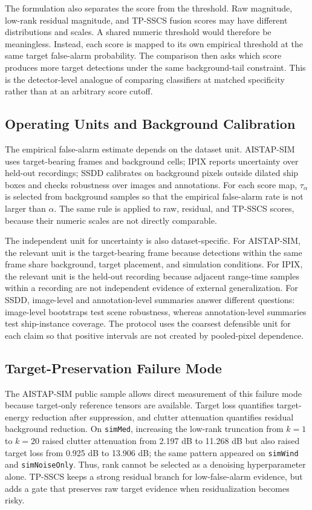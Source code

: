 \documentclass[journal]{IEEEtran}
\begin{document}
The formulation also separates the score from the threshold. Raw magnitude, low-rank residual magnitude, and TP-SSCS fusion scores may have different distributions and scales. A shared numeric threshold would therefore be meaningless. Instead, each score is mapped to its own empirical threshold at the same target false-alarm probability. The comparison then asks which score produces more target detections under the same background-tail constraint. This is the detector-level analogue of comparing classifiers at matched specificity rather than at an arbitrary score cutoff.

\subsection{Operating Units and Background Calibration}

The empirical false-alarm estimate depends on the dataset unit. AISTAP-SIM uses target-bearing frames and background cells; IPIX reports uncertainty over held-out recordings; SSDD calibrates on background pixels outside dilated ship boxes and checks robustness over images and annotations. For each score map, $\tau_\alpha$ is selected from background samples so that the empirical false-alarm rate is not larger than $\alpha$. The same rule is applied to raw, residual, and TP-SSCS scores, because their numeric scales are not directly comparable.

The independent unit for uncertainty is also dataset-specific. For AISTAP-SIM, the relevant unit is the target-bearing frame because detections within the same frame share background, target placement, and simulation conditions. For IPIX, the relevant unit is the held-out recording because adjacent range-time samples within a recording are not independent evidence of external generalization. For SSDD, image-level and annotation-level summaries answer different questions: image-level bootstraps test scene robustness, whereas annotation-level summaries test ship-instance coverage. The protocol uses the coarsest defensible unit for each claim so that positive intervals are not created by pooled-pixel dependence.
\subsection{Target-Preservation Failure Mode}

The AISTAP-SIM public sample allows direct measurement of this failure mode because target-only reference tensors are available. Target loss quantifies target-energy reduction after suppression, and clutter attenuation quantifies residual background reduction. On \texttt{simMed}, increasing the low-rank truncation from $k=1$ to $k=20$ raised clutter attenuation from 2.197 dB to 11.268 dB but also raised target loss from 0.925 dB to 13.906 dB; the same pattern appeared on \texttt{simWind} and \texttt{simNoiseOnly}. Thus, rank cannot be selected as a denoising hyperparameter alone. TP-SSCS keeps a strong residual branch for low-false-alarm evidence, but adds a gate that preserves raw target evidence when residualization becomes risky.
\end{document}

